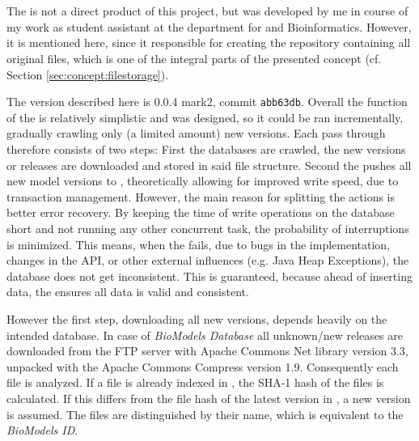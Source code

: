 
\section{\modelcrawler}
	\label{sec:impl:modelcrawler}
	The \modelcrawler is not a direct product of this project, but was developed by me in course of my work as student assistant at the department for \sysbio and Bioinformatics. However, it is mentioned here, since it responsible for creating the repository containing all original files, which is one of the integral parts of the presented concept (cf. Section \ref{sec:concept:filestorage}).
	
	The version described here is 0.0.4 mark2, commit \texttt{abb63db}. Overall the function of the \modelcrawler is relatively simplistic and was designed, so it could be ran incrementally, gradually crawling only (a limited amount) new versions. Each pass through therefore consists of two steps: First the databases are crawled, the new versions or releases are downloaded and stored in said file structure.
	Second the \modelcrawler pushes all new model versions to \masymos, theoretically allowing for improved write speed, due to transaction management. However, the main reason for splitting the actions is better error recovery. By keeping the time of write operations on the database short and not running any other concurrent task, the probability of interruptions is minimized. This means, when the \modelcrawler fails, due to bugs in the implementation, changes in the API, or other external influences (e.g. Java Heap Exceptions), the database does not get inconsistent. This is guaranteed, because ahead of inserting data, the \modelcrawler ensures all data is valid and consistent.
	
	However the first step, downloading all new versions, depends heavily on the intended database.
	In case of \emph{BioModels Database} all unknown/new releases are downloaded from the FTP server with Apache Commons Net library version 3.3, unpacked with the Apache Commons Compress version 1.9. Consequently each \xml file is analyzed.
	If a file is already indexed in \masymos, the SHA-1 hash of the files is calculated. If this differs from the file hash of the latest version in \masymos, a new version is assumed. The files are distinguished by their name, which is equivalent to the \emph{BioModels ID}.
	
